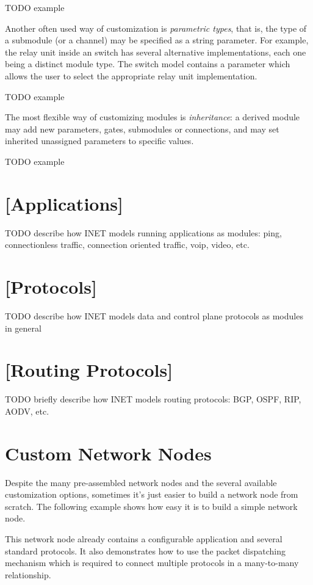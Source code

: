 TODO example

Another often used way of customization is \textit{parametric types}, that is, the
type of a submodule (or a channel) may be specified as a string parameter.
For example, the relay unit inside an  switch has
several alternative implementations, each one being a distinct module type.
The switch model contains a parameter which allows the user to select the
appropriate relay unit implementation.

TODO example

The most flexible way of customizing modules is \textit{inheritance}: a derived
module may add new parameters, gates, submodules or connections, and may
set inherited unassigned parameters to specific values.

TODO example


\section{[Applications]} %
\label{subsec:applications}

TODO describe how INET models running applications as modules: ping, connectionless traffic, connection oriented traffic, voip, video, etc.

\section{[Protocols]} %
\label{subsec:protocols}

TODO describe how INET models data and control plane protocols as modules in general

\section{[Routing Protocols]} %

TODO briefly describe how INET models routing protocols: BGP, OSPF, RIP, AODV, etc.

\section{Custom Network Nodes}

Despite the many pre-assembled network nodes and the several available
customization options, sometimes it's just easier to build a network node
from scratch. The following example shows how easy it is to build a simple
network node.

This network node already contains a configurable application and several
standard protocols. It also demonstrates how to use the packet dispatching
mechanism which is required to connect multiple protocols in a many-to-many
relationship.





